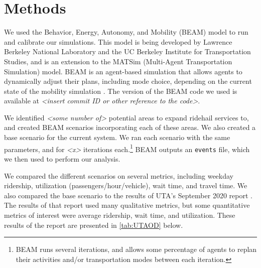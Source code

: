 \documentclass[3p, authoryear]{elsarticle} %
\begin{document}
\hypertarget{methods}{%
\section{Methods}\label{methods}}

We used the Behavior, Energy, Autonomy, and Mobility (BEAM) model to run and calibrate our simulations.
This model is being developed by Lawrence Berkeley National Laboratory and the UC Berkeley Institute for Transportation Studies, and is an extension to the MATSim (Multi-Agent Transportation Simulation) model.
BEAM is an agent-based simulation that allows agents to dynamically adjust their plans, including mode choice, depending on the current state of the mobility simulation \citep{beamdocs}.
The version of the BEAM code we used is available at \emph{\textless insert commit ID or other reference to the code\textgreater{}}.

We identified \emph{\textless some number of\textgreater{}} potential areas to expand ridehail services to, and created BEAM scenarios incorporating each of these areas.
We also created a base scenario for the current system.
We ran each scenario with the same parameters, and for \emph{\textless x\textgreater{}} iterations each.\footnote{BEAM runs several iterations, and allows some percentage of agents to replan their activities and/or transportation modes between each iteration.}
BEAM outputs an \texttt{events} file, which we then used to perform our analysis.

We compared the different scenarios on several metrics, including weekday ridership, utilization (passengers/hour/vehicle), wait time, and travel time.
We also compared the base scenario to the results of UTA's September 2020 report \citep{UTAreport}.
The results of that report used many qualitative metrics, but some quantitative metrics of interest were average ridership, wait time, and utilization. These results of the report are presented in \ref{tab:UTAOD} below.
\end{document}
